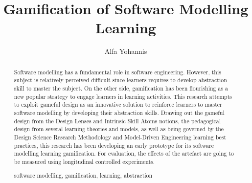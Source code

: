 \documentclass[runningheads,a4paper]{llncs}
\newcommand{\keywords}[1]{\par\addvspace\baselineskip
\noindent\keywordname\enspace\ignorespaces#1}
\begin{document}
\mainmatter  %

\title{Gamification of Software Modelling Learning}


%
%
\author{Alfa Yohannis}
%


%
%

\maketitle


\begin{abstract}
Software modelling has a fundamental role in software engineering. However, this subject is relatively perceived difficult since learners requires to develop abstraction skill to master the subject. On the other side, gamification has been flourishing as a new popular strategy to engage learners in learning activities. This research attempts to exploit gameful design as an innovative solution to reinforce learners to master software modelling by developing their abstraction skills. Drawing out the gameful design from the Design Lenses and Intrinsic Skill Atoms notions, the pedagogical design from several learning theories and models, as well as being governed by the Design Science Research Methodology and Model-Driven Engineering learning best practices, this research has been developing an early prototype for its software modelling learning gamification. For evaluation, the effects of the artefact are going to be measured using longitudinal controlled experiments.
\keywords{software modelling, gamification, learning, abstraction}
\end{abstract}
\end{document}
